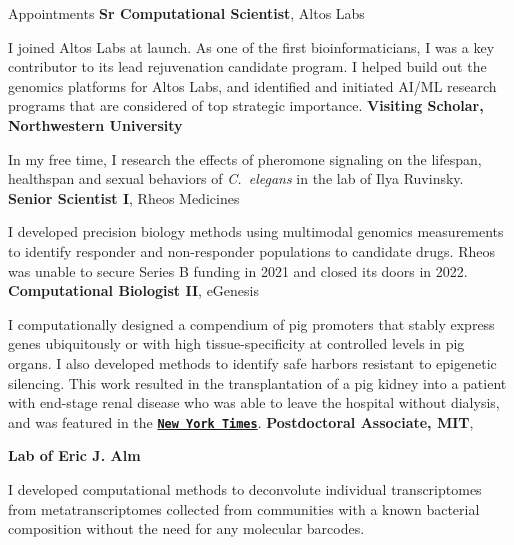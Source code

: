 \begin{rubric}{Appointments}
		\textbf{Sr Computational Scientist}, Altos Labs\par
		I joined Altos Labs at launch. As one of the first bioinformaticians,
		I was a key contributor to its lead rejuvenation candidate program.
		I helped build out the genomics platforms for Altos Labs, and identified
		and initiated AI/ML research programs that are considered of top strategic
		importance.
	\textbf{Visiting Scholar, Northwestern University}\par
	In my free time, I research the effects of pheromone signaling on
	the lifespan, healthspan and sexual behaviors of \textit{C.~elegans} in the lab
	of Ilya Ruvinsky.
\entry*[03/2021 - 01/2022]
	\textbf{Senior Scientist I}, Rheos Medicines\par
	I developed precision biology methods using multimodal genomics measurements to
	identify responder and non-responder populations to candidate drugs.
	Rheos was unable to secure Series B funding in 2021 and closed its doors in 2022.
\entry*[11/2019 - 3/2021]
	\textbf{Computational Biologist II}, eGenesis\par
	I computationally designed a compendium of pig promoters that stably
	express genes ubiquitously or with high tissue-specificity at controlled
	levels in pig organs. I also developed methods to identify safe harbors
	resistant to epigenetic silencing. This work resulted in the transplantation
	of a pig kidney into a patient with end-stage renal disease who was able
	to leave the hospital without dialysis, and was featured in the 
	\href{https://www.nytimes.com/2024/03/21/health/pig-kidney-organ-transplant.html}{\texttt{\textbf{New York Times}}}.
\entry*[01/2019--11/2019]
		\textbf{Postdoctoral Associate, MIT},\par
		\textbf{Lab of Eric J. Alm}\par	
		I developed computational methods to deconvolute individual transcriptomes
		from metatranscriptomes collected from communities with a known bacterial
		composition without the need for any molecular barcodes.	
\end{rubric}
